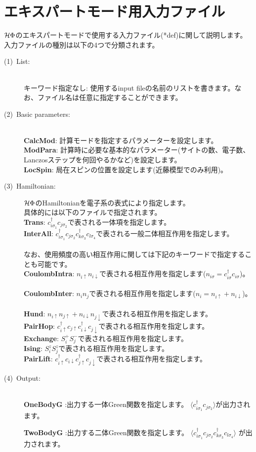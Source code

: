 \newpage
\section{エキスパートモード用入力ファイル}
\label{Ch:HowToExpert}

$\mathcal{H} \Phi$のエキスパートモードで使用する入力ファイル(*def)に関して説明します。
入力ファイルの種別は以下の4つで分類されます。
\begin{description}
\item[(1)~List:]
~\\{キーワード指定なし}:
使用するinput fileの名前のリストを書きます。なお、ファイル名は任意に指定することができます。
\item[(2)~Basic parameters:]
~\\{\bf CalcMod}: 計算モードを指定するパラメーターを設定します。
~\\{\bf ModPara}: 計算時に必要な基本的なパラメーター(サイトの数、電子数、Lanczosステップを何回やるかなど)を設定します。
~\\{\bf LocSpin}: 局在スピンの位置を設定します(近藤模型でのみ利用)。
\item[(3)~Hamiltonian:] 
$\mathcal{H} \Phi$のHamiltonianを電子系の表式により指定します。
~\\具体的には以下のファイルで指定されます。
~\\{\bf Trans}: $c_{i\sigma_1}^{\dag}c_{j\sigma_2}$で表される一体項を指定します。
~\\{\bf InterAll}: $c_ {i \sigma_1}^{\dag}c_{j\sigma_2}c_{k \sigma_3}^{\dag}c_{l \sigma_4}$で表される一般二体相互作用を指定します。\\
~\\なお、使用頻度の高い相互作用に関しては下記のキーワードで指定することも可能です。
~\\{\bf CoulombIntra}: $n_ {i \uparrow}n_{i \downarrow}$で表される相互作用を指定します($n_{i \sigma}=c_{i\sigma}^{\dag}c_{i\sigma}$)。
~\\{\bf CoulombInter}: $n_ {i}n_{j}$で表される相互作用を指定します($n_i=n_{i\uparrow}+n_{i\downarrow}$)。
~\\{\bf Hund}: $n_{i\uparrow}n_{j\uparrow}+n_{i\downarrow}n_{j\downarrow}$で表される相互作用を指定します。
~\\{\bf PairHop}:  $c_ {i \uparrow}^{\dag}c_{j\uparrow}c_{i \downarrow}^{\dag}c_{j  \downarrow}$で表される相互作用を指定します。
~\\{\bf Exchange}: $S_i^+ S_j^-$で表される相互作用を指定します。
~\\{\bf Ising}: $S_i^z S_j^z$で表される相互作用を指定します。
~\\{\bf PairLift}: $c_ {i \uparrow}^{\dag}c_{i\downarrow}c_{j \uparrow}^{\dag}c_{j \downarrow}$で表される相互作用を指定します。
\item[(4)~Output:]
~\\{\bf OneBodyG }:出力する一体Green関数を指定します。
 $\langle c^{\dagger}_{i\sigma_1}c_{j\sigma_2}\rangle$が出力されます。

 {\bf TwoBodyG }:出力する二体Green関数を指定します。
 $\langle c^{\dagger}_{i\sigma_1}c_{j\sigma_2}c^{\dagger}_{k \sigma_3}c_{l\sigma_4}\rangle$
が出力されます。
\end{description}
